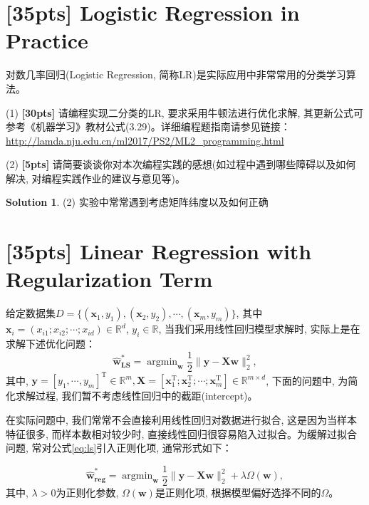 \documentclass[a4paper,UTF8]{article}
\numberwithin{equation}{section}
\theoremstyle{definition}
\newtheorem*{solution}{Solution}
\begin{document}
\section{[35pts] Logistic Regression in Practice} 
对数几率回归(Logistic Regression, 简称LR)是实际应用中非常常用的分类学习算法。

(1) \textbf{[30pts]} 请编程实现二分类的LR, 要求采用牛顿法进行优化求解, 其更新公式可参考《机器学习》教材公式(3.29)。详细编程题指南请参见链接：\url{http://lamda.nju.edu.cn/ml2017/PS2/ML2_programming.html}

(2) \textbf{[5pts]} 请简要谈谈你对本次编程实践的感想(如过程中遇到哪些障碍以及如何解决, 对编程实践作业的建议与意见等)。
\begin{solution}
(2) 实验中常常遇到考虑矩阵纬度以及如何正确
\end{solution}


\section{[35pts] Linear Regression with Regularization Term}

给定数据集$D = \{(\mathbf{x}_1,y_1),(\mathbf{x}_2,y_2),\cdots,(\mathbf{x}_m,y_m)\}$, 其中$\mathbf{x}_i = (x_{i1};x_{i2};\cdots;x_{id}) \in \mathbb{R}^d$, $y_i \in \mathbb{R}$, 当我们采用线性回归模型求解时, 实际上是在求解下述优化问题：
\begin{equation}
\label{eq:ls}
\hat{\mathbf{w}}_{\textbf{LS}}^* = \mathop{\arg\min}_{\mathbf{w}} \frac{1}{2}\lVert \mathbf{y} - \mathbf {X}\mathbf{w} \rVert_2^2,
\end{equation}
其中, $\mathbf{y} = [y_1,\cdots,y_m]^\mathrm{T} \in \mathbb{R}^m, \mathbf{X} = [\mathbf{x}_1^\mathrm{T};\mathbf{x}_2^\mathrm{T};\cdots;\mathbf{x}_m^\mathrm{T}]\in \mathbb{R}^{m\times d}$, 下面的问题中, 为简化求解过程, 我们暂不考虑线性回归中的截距(intercept)。

在实际问题中, 我们常常不会直接利用线性回归对数据进行拟合, 这是因为当样本特征很多, 而样本数相对较少时, 直接线性回归很容易陷入过拟合。为缓解过拟合问题, 常对公式\eqref{eq:ls}引入正则化项, 通常形式如下：

\begin{equation}
\label{eq:ls-regular}
\hat{\mathbf{w}}_{\textbf{reg}}^* = \mathop{\arg\min}_{\mathbf{w}} \frac{1}{2}\lVert \mathbf{y} - \mathbf X \mathbf{w} \rVert_2^2 +\lambda \Omega(\mathbf{w}),
\end{equation}
其中, $\lambda> 0$为正则化参数, $\Omega(\mathbf{w})$是正则化项, 根据模型偏好选择不同的$\Omega$。
\end{document}

